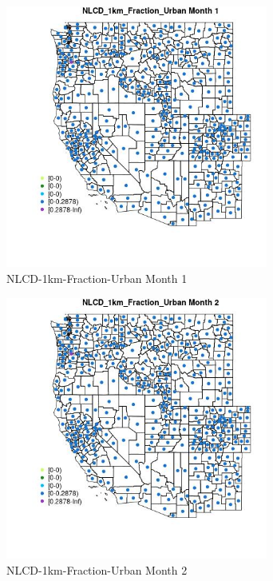 \begin{figure} 
\centering  
\includegraphics[width=0.77\textwidth]{Code_Outputs/df_report_ML_predictors_CountyCentroid_Locations_Dates_2008-01-01to2018-12-31_MapObsMo1NLCD_1km_Fraction_Urban.jpg} 
\caption{\label{fig:df_report_ML_predictors_CountyCentroid_Locations_Dates_2008-01-01to2018-12-31MapObsMo1NLCD_1km_Fraction_Urban}NLCD-1km-Fraction-Urban Month 1} 
\end{figure} 
 

\begin{figure} 
\centering  
\includegraphics[width=0.77\textwidth]{Code_Outputs/df_report_ML_predictors_CountyCentroid_Locations_Dates_2008-01-01to2018-12-31_MapObsMo2NLCD_1km_Fraction_Urban.jpg} 
\caption{\label{fig:df_report_ML_predictors_CountyCentroid_Locations_Dates_2008-01-01to2018-12-31MapObsMo2NLCD_1km_Fraction_Urban}NLCD-1km-Fraction-Urban Month 2} 
\end{figure} 
 

